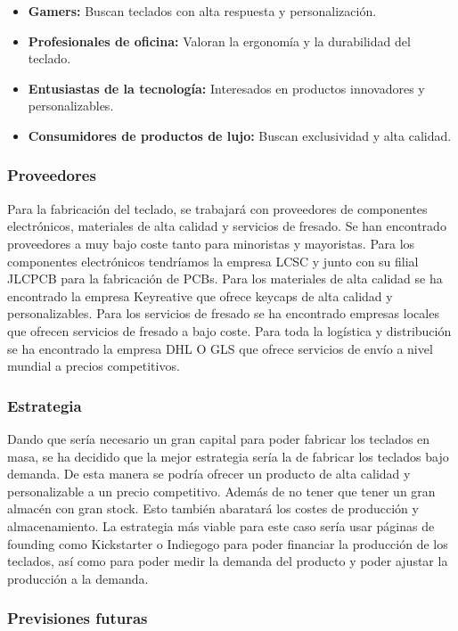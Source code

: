 \begin{itemize}
\item \textbf{Gamers:} Buscan teclados con alta respuesta y personalización.
\item \textbf{Profesionales de oficina:} Valoran la ergonomía y la durabilidad del teclado.
\item \textbf{Entusiastas de la tecnología:} Interesados en productos innovadores y personalizables.
\item \textbf{Consumidores de productos de lujo:} Buscan exclusividad y alta calidad.
\end{itemize}

\subsubsection{Proveedores}

Para la fabricación del teclado, se trabajará con proveedores de componentes electrónicos, materiales de alta calidad y servicios de fresado. Se han encontrado proveedores a muy bajo coste tanto para minoristas y mayoristas. Para los componentes electrónicos tendríamos la empresa LCSC y junto con su filial JLCPCB para la fabricación de PCBs.
Para los materiales de alta calidad se ha encontrado la empresa Keyreative que ofrece keycaps de alta calidad y personalizables.
Para los servicios de fresado se ha encontrado empresas locales que ofrecen servicios de fresado a bajo coste.
Para toda la logística y distribución se ha encontrado la empresa DHL O GLS que ofrece servicios de envío a nivel mundial a precios competitivos.

\subsubsection{Estrategia}

Dando que sería necesario un gran capital para poder fabricar los teclados en masa, se ha decidido que la mejor estrategia sería la de fabricar los teclados bajo demanda. De esta manera se podría ofrecer un producto de alta calidad y personalizable a un precio competitivo. Además de no tener que tener un gran almacén con gran stock. Esto también abaratará los costes de producción y almacenamiento. La estrategia más viable para este caso sería usar páginas de founding como Kickstarter o Indiegogo para poder financiar la producción de los teclados, así como para poder medir la demanda del producto y poder ajustar la producción a la demanda.

\subsubsection{Previsiones futuras}

